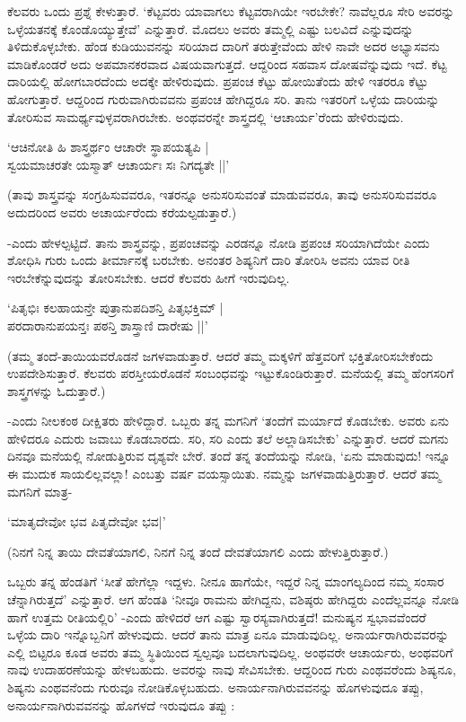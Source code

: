 ಕೆಲವರು ಒಂದು ಪ್ರಶ್ನೆ ಕೇಳುತ್ತಾರೆ. `ಕೆಟ್ಟವರು ಯಾವಾಗಲು ಕೆಟ್ಟವರಾಗಿಯೇ ಇರಬೇಕೇ? ನಾವೆಲ್ಲರೂ ಸೇರಿ ಅವರನ್ನು ಒಳ್ಳೆಯತನಕ್ಕೆ ಕೊಂಡೊಯ್ಯುತ್ತೇವೆ' ಎನ್ನುತ್ತಾರೆ. ಮೊದಲು ಅವರು ತಮ್ಮಲ್ಲಿ ಎಷ್ಟು ಬಲವಿದೆ ಎನ್ನುವುದನ್ನು  ತಿಳಿದುಕೊಳ್ಳಬೇಕು. ಹೆಂಡ ಕುಡಿಯುವನನ್ನು ಸರಿಯಾದ ದಾರಿಗೆ ತರುತ್ತೇವೆಂದು ಹೇಳಿ ನಾವೇ ಅದರ ಅಭ್ಯಾಸವನು ಮಾಡಿಕೊಂಡರೆ ಅದು ಅಪಮಾನಕರವಾದ ವಿಷಯವಾಗುತ್ತದೆ. ಆದ್ದರಿಂದ ಸಹವಾಸ ದೋಷವೆನ್ನುವುದು ಇದೆ. ಕೆಟ್ಟ ದಾರಿಯಲ್ಲಿ ಹೋಗಬಾರದೆಂದು ಅದಕ್ಕೇ ಹೇಳಿರುವುದು. ಪ್ರಪಂಚ ಕೆಟ್ಟು ಹೋಯಿತೆಂದು ಹೇಳಿ ಇತರರೂ ಕೆಟ್ಟು ಹೋಗುತ್ತಾರೆ. ಆದ್ದರಿಂದ ಗುರುವಾಗಿರುವವನು ಪ್ರಪಂಚ ಹೇಗಿದ್ದರೂ ಸರಿ. ತಾನು ಇತರರಿಗೆ ಒಳ್ಳೆಯ ದಾರಿಯನ್ನು ತೋರಿಸುವ ಸಾಮರ್ಥ್ಯವುಳ್ಳವರಾಗಿರಬೇಕು. ಅಂಥವರನ್ನೇ ಶಾಸ್ತ್ರದಲ್ಲಿ `ಆಚಾರ್ಯ'ರೆಂದು ಹೇಳಿರುವುದು. 

\begin{shloka} 
`ಆಚಿನೋತಿ ಹಿ ಶಾಸ್ತ್ರರ್ಥಂ ಆಚಾರೇ ಸ್ಥಾಪಯತ್ಯಪಿ |\\
ಸ್ವಯಮಾಚರತೇ ಯಸ್ಮಾತ್ ಆಚಾರ್ಯಃ ಸಃ ನಿಗದ್ಯತೇ ||'
\end{shloka}
 
(ತಾವು ಶಾಸ್ತ್ರವನ್ನು ಸಂಗ್ರಹಿಸುವವರೂ, ಇತರನ್ನೂ ಅನುಸರಿಸುವಂತೆ ಮಾಡುವವರೂ, ತಾವು ಅನುಸರಿಸುವವರೂ ಅದುದರಿಂದ ಅವರು ಅಚಾರ್ಯರೆಂದು ಕರೆಯಲ್ಪಡುತ್ತಾರೆ.)

-ಎಂದು ಹೇಳಲ್ಪಟ್ಟಿದೆ. ತಾನು ಶಾಸ್ತ್ರವನ್ನು, ಪ್ರಪಂಚವನ್ನು ಎರಡನ್ನೂ ನೋಡಿ ಪ್ರಪಂಚ ಸರಿಯಾಗಿದೆಯೇ ಎಂದು ಶೋಧಿಸಿ ಗುರು ಒಂದು ತೀರ್ಮಾನಕ್ಕೆ ಬರಬೇಕು. ಅನಂತರ ಶಿಷ್ಯನಿಗೆ ದಾರಿ ತೋರಿಸಿ ಅವನು ಯಾವ ರೀತಿ ಇರಬೇಕೆನ್ನುವುದನ್ನು ತೋರಿಸಬೇಕು. ಆದರೆ ಕೆಲವರು ಹೀಗೆ ಇರುವುದಿಲ್ಲ. 


\begin{shloka}
`ಪಿತೃಭಿಃ ಕಲಹಾಯನ್ತೇ ಪುತ್ರಾನುಪದಿಶನ್ತಿ ಪಿತೃಭಕ್ತಿಮ್ |\\
ಪರದಾರಾನುಪಯನ್ತಃ ಪಠನ್ತಿ ಶಾಸ್ತ್ರಾಣಿ ದಾರೇಷು ||'
\end{shloka}

(ತಮ್ಮ ತಂದೆ-ತಾಯಿಯವರೊಡನೆ ಜಗಳವಾಡುತ್ತಾರೆ. ಆದರೆ ತಮ್ಮ ಮಕ್ಕಳಿಗೆ ಹೆತ್ತವರಿಗೆ ಭಕ್ತಿತೋರಿಸಬೇಕೆಂದು ಉಪದೇಶಿಸುತ್ತಾರೆ. ಕೆಲವರು ಪರಸ್ತೀಯರೊಡನೆ ಸಂಬಂಧವನ್ನು ಇಟ್ಟುಕೊಂಡಿರುತ್ತಾರೆ. ಮನೆಯಲ್ಲಿ ತಮ್ಮ ಹೆಂಗಸರಿಗೆ ಶಾಸ್ತ್ರಗಳನ್ನು ಓದುತ್ತಾರೆ.)

-ಎಂದು ನೀಲಕಂಠ ದೀಕ್ಷಿತರು ಹೇಳಿದ್ದಾರೆ. ಒಬ್ಬರು ತನ್ನ ಮಗನಿಗೆ  `ತಂದೆಗೆ ಮರ್ಯಾದೆ ಕೊಡಬೇಕು. ಅವರು ಏನು ಹೇಳಿದರೂ ಎದುರು ಜವಾಬು ಕೊಡಬಾರದು. ಸರಿ, ಸರಿ ಎಂದು ತಲೆ ಅಲ್ಲಾಡಿಸಬೇಕು' ಎನ್ನುತ್ತಾರೆ. ಆದರೆ ಮಗನು ದಿನವೂ ಮನೆಯಲ್ಲಿ ನೋಡುತ್ತಿರುವ ದೃಶ್ಯವೇ ಬೇರೆ. ತಂದೆ ತನ್ನ ತಂದೆಯನ್ನು ನೋಡಿ, `ಏನು ಮಾಡುವುದು! ಇನ್ನೂ ಈ ಮುದುಕ ಸಾಯಲಿಲ್ಲವಲ್ಲಾ! ಎಂಬತ್ತು ವರ್ಷ ವಯಸ್ಸಾಯಿತು. ನಮ್ಮನ್ನು  ಜಗಳವಾಡುತ್ತಿರುತ್ತಾರೆ. ಆದರೆ ತಮ್ಮ ಮಗನಿಗೆ ಮಾತ್ರ-

\begin{shloka}
`ಮಾತೃದೇವೋ ಭವ ಪಿತೃದೇವೋ ಭವ|'
\end{shloka}

(ನಿನಗೆ ನಿನ್ನ ತಾಯಿ ದೇವತೆಯಾಗಲಿ, ನಿನಗೆ ನಿನ್ನ ತಂದೆ ದೇವತೆಯಾಗಲಿ ಎಂದು ಹೇಳುತ್ತಿರುತ್ತಾರೆ.)

ಒಬ್ಬರು ತನ್ನ ಹೆಂಡತಿಗೆ `ಸೀತೆ ಹೇಗೆಲ್ಲಾ ಇದ್ದಳು. ನೀನೂ ಹಾಗೆಯೇ, ಇದ್ದರೆ ನಿನ್ನ ಮಾಂಗಲ್ಯದಿಂದ ನಮ್ಮ ಸಂಸಾರ ಚೆನ್ನಾಗಿರುತ್ತದೆ' ಎನ್ನುತ್ತಾರೆ. ಆಗ ಹೆಂಡತಿ `ನೀವೂ ರಾಮನು ಹೇಗಿದ್ದನು, ವಶಿಷ್ಠರು ಹೇಗಿದ್ದರು ಎಂದೆಲ್ಲವನ್ನೂ ನೋಡಿ ಹಾಗೆ ಉತ್ತಮ ರೀತಿಯಲ್ಲಿರಿ' -ಎಂದು ಹೇಳಿದರೆ ಆಗ ಎಷ್ಟು  ಸ್ವಾರಸ್ಯವಾಗಿರುತ್ತದೆ! ಮನುಷ್ಯನ ಸ್ವಭಾವವೆಂದರೆ ಒಳ್ಳೆಯ ದಾರಿ ಇನ್ನೊಬ್ಬನಿಗೆ ಹೇಳುವುದು. ಆದರೆ ತಾನು ಮಾತ್ರ ಏನೂ ಮಾಡುವುದಿಲ್ಲ. ಅನಾರ್ಯರಾಗಿರುವವರನ್ನು ಎಲ್ಲಿ ಬಿಟ್ಟರೂ ಕೂಡ ಅವರು ತಮ್ಮ ಸ್ಥಿತಿಯಿಂದ ಸ್ವಲ್ಪವೂ ಬದಲಾಗುವುದಿಲ್ಲ. ಅಂಥವರೇ ಆಚಾರ್ಯರು, ಅಂಥವರಿಗೆ ನಾವು ಉದಾಹರಣೆಯನ್ನು ಹೇಳಬಹುದು. ಅವರನ್ನು ನಾವು ಸೇವಿಸಬೇಕು. ಆದ್ದರಿಂದ ಗುರು ಎಂಥವರೆಂದು ಶಿಷ್ಯನೂ, ಶಿಷ್ಯನು ಎಂಥವನೆಂದು ಗುರುವೂ ನೋಡಿಕೊಳ್ಳಬಹುದು. ಅನಾರ್ಯನಾಗಿರುವವನನ್ನು ಹೊಗಳುವುದೂ ತಪ್ಪು, ಅನಾರ್ಯನಾಗಿರುವವನನ್ನು ಹೊಗಳದೆ ಇರುವುದೂ ತಪ್ಪು :


